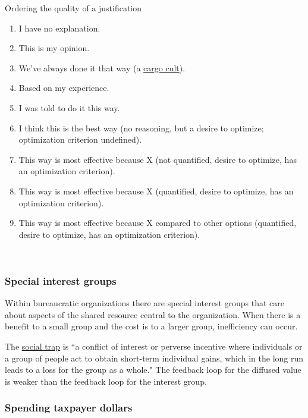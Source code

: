 Ordering the quality of a justification
\begin{enumerate}
    \item I have no explanation.
    \item This is my opinion.
    \item We've always done it that way (a \href{https://en.wikipedia.org/wiki/Cargo_cult}{cargo cult}).
    \item Based on my experience.
    \item I was told to do it this way.
    \item I think this is the best way (no reasoning, but a desire to optimize; optimization criterion undefined).
    \item This way is most effective because X (not quantified, desire to optimize, has an optimization criterion).
    \item This way is most effective because X (quantified, desire to optimize, has an optimization criterion).
    \item This way is most effective because X compared to other options (quantified, desire to optimize, has an optimization criterion).
\end{enumerate}


\ \\



\subsubsection*{Special interest groups}

Within bureaucratic organizations there are special interest groups that care about aspects of the shared resource central to the organization. 
When there is a benefit to a small group and the cost is to a larger group, inefficiency can occur.

The \href{https://en.wikipedia.org/wiki/Social_trap}{social trap} is ``a conflict of interest or perverse incentive where individuals or a group of people act to obtain short-term individual gains, which in the long run leads to a loss for the group as a whole."
The feedback loop for the diffused value is weaker than the feedback loop for the interest group. 

\subsubsection*{Spending taxpayer dollars}

